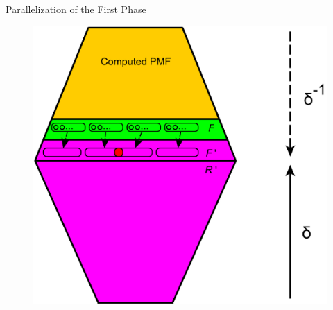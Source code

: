 \documentclass{beamer}
\begin{document}
\begin{frame}{Parallelization of the First Phase}
	\begin{figure}
		\includegraphics[height=0.8\textheight]{figs/f2r_parallel.pdf}
		\caption{}
	\end{figure}
\end{frame}
%
%	
%	
\end{document}
